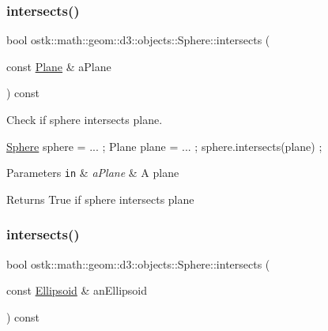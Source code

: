 \subsubsection{\texorpdfstring{intersects()}{intersects()}\hspace{0.1cm}{\footnotesize\ttfamily [6/9]}}
{\footnotesize\ttfamily bool ostk\+::math\+::geom\+::d3\+::objects\+::\+Sphere\+::intersects (\begin{DoxyParamCaption}\item[{const \hyperlink{classostk_1_1math_1_1geom_1_1d3_1_1objects_1_1_plane}{Plane} \&}]{a\+Plane }\end{DoxyParamCaption}) const}



Check if sphere intersects plane. 


\begin{DoxyCode}
\hyperlink{classostk_1_1math_1_1geom_1_1d3_1_1objects_1_1_sphere_a6920f72260a7b2c9ffc29283540e16c2}{Sphere} sphere = ... ;
Plane plane = ... ;
sphere.intersects(plane) ;
\end{DoxyCode}



\begin{DoxyParams}[1]{Parameters}
\mbox{\tt in}  & {\em a\+Plane} & A plane \\
\hline
\end{DoxyParams}
\begin{DoxyReturn}{Returns}
True if sphere intersects plane 
\end{DoxyReturn}
\mbox{\label{classostk_1_1math_1_1geom_1_1d3_1_1objects_1_1_sphere_acbde8aef7194e50be8be8fe5c5fa2e17}} 
\subsubsection{\texorpdfstring{intersects()}{intersects()}\hspace{0.1cm}{\footnotesize\ttfamily [7/9]}}
{\footnotesize\ttfamily bool ostk\+::math\+::geom\+::d3\+::objects\+::\+Sphere\+::intersects (\begin{DoxyParamCaption}\item[{const \hyperlink{classostk_1_1math_1_1geom_1_1d3_1_1objects_1_1_ellipsoid}{Ellipsoid} \&}]{an\+Ellipsoid }\end{DoxyParamCaption}) const}



